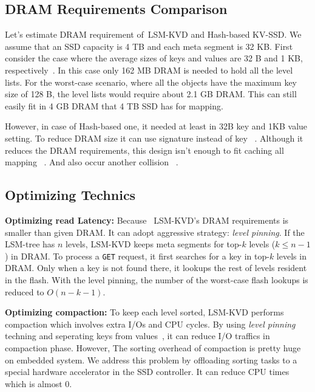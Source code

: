 \documentclass{abstract_hutech}
\newcommand{\ours}{LSM-KVD}
\begin{document}
\subsection{DRAM Requirements Comparison}
Let's estimate DRAM requirement of~\ours{} and Hash-based KV-SSD.
We assume that an SSD capacity is 4 TB and each meta segment is 32 KB. 
First consider the case where the average sizes of keys and values are 32 B and 1 KB,
respectively~\cite{kvsize}. In this case only 162 MB DRAM is needed to hold all the level lists.
For the worst-case scenario, where all the objects have the maximum key size of 128 B,
the level lists would require about 2.1 GB DRAM. 
This can still easily fit in 4 GB DRAM that 4 TB SSD has for mapping.

However, in case of Hash-based one, it needed at least  in 32B key and 1KB value setting.
To reduce DRAM size it can use signature instead of key ~\cite{bluedbm,kaml}. 
Although it reduces the DRAM requirements, this design isn't enough to fit caching all mapping ~.
And also occur another collision ~.


\subsection{Optimizing Technics}

\textbf{Optimizing read Latency:}
Because ~\ours{}'s DRAM requirements is smaller than given DRAM.
It can adopt aggressive strategy: \textit{level pinning}. 
If the LSM-tree has $n$ levels, \ours{} keeps meta segments for top-$k$ levels ($k \le n-1$) in DRAM.
To process a \texttt{GET} request, it first searches for a key in top-$k$
levels in DRAM.  Only when a key is not found there, it lookups the rest
of levels resident in the flash.  With the level pinning, the number of the
worst-case flash lookups is reduced to $O(n-k-1)$. 

\textbf{Optimizing compaction:}
To keep each level sorted, \ours{} performs compaction which involves extra I/Os and CPU cycles.
By using \textit{level pinning} techning and seperating keys from values{~\cite{wisckey}}, it can reduce I/O traffics in compaction phase. 
However, The sorting overhead of compaction is pretty huge on embedded system. 
We address this problem by offloading sorting tasks to a special hardware accelerator in the SSD controller. It can reduce CPU times  which is almost 0.
\end{document}
